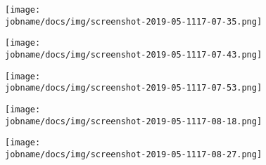 \begin{figure}[h!]
    \centering
    \texttt{[image: \\jobname/docs/img/screenshot-2019-05-1117-07-35.png]}
\end{figure}

\begin{figure}[h!]
    \centering
    \texttt{[image: \\jobname/docs/img/screenshot-2019-05-1117-07-43.png]}
\end{figure}

\begin{figure}[h!]
    \centering
    \texttt{[image: \\jobname/docs/img/screenshot-2019-05-1117-07-53.png]}
\end{figure}

\begin{figure}[h!]
    \centering
    \texttt{[image: \\jobname/docs/img/screenshot-2019-05-1117-08-18.png]}
\end{figure}

\begin{figure}[h!]
    \centering
    \texttt{[image: \\jobname/docs/img/screenshot-2019-05-1117-08-27.png]}
\end{figure}

